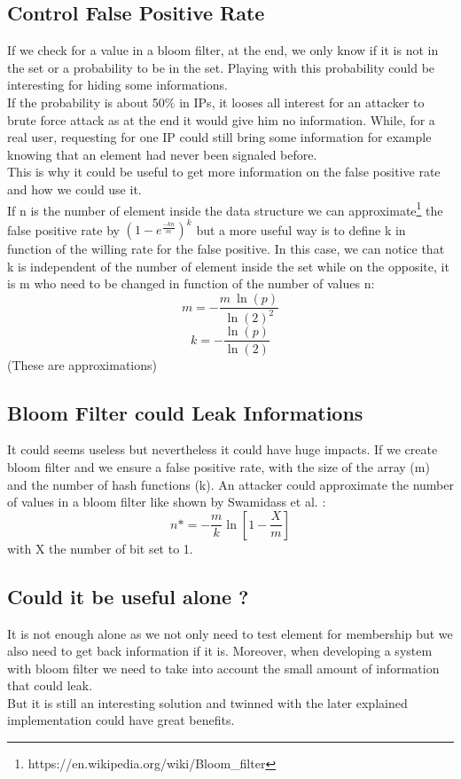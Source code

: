 \documentclass{eplmastersthesis}
\begin{document}
\subsection{Control False Positive Rate}
If we check for a value in a bloom filter, at the end, we only know if it is not in the set or a probability to be in the set. Playing with this probability could be interesting for hiding some informations. \\
If the probability is about 50\% in IPs, it looses all interest for an attacker to brute force attack as at the end it would give him no information. While, for a real user, requesting for one IP could still bring some information for example knowing that an element had never been signaled before.\\
This is why it could be useful to get more information on the false positive rate and how we could use it.\\

If n is the number of element inside the data structure we can approximate\footnote{https://en.wikipedia.org/wiki/Bloom\_filter} the false positive rate by $(1-e^{\frac{-kn}{m}})^k$ but a more useful way is to define k in function of the willing rate for the false positive. In this case, we can notice that k is independent of the number of element inside the set while on the opposite, it is m who need to be changed in function of the number of values n:
$$m = - \frac{m\ \ln(p)}{\ln(2)^2}$$
$$k = - \frac{\ln(p)}{\ln(2)}$$
(These are approximations)

\subsection{Bloom Filter could Leak Informations}
It could seems useless but nevertheless it could have huge impacts. If we create bloom filter and we ensure a false positive rate, with the size of the array (m) and the number of hash functions (k). An attacker could approximate the number of values in a bloom filter like shown by Swamidass et al. \cite{swamidass2007mathematical}:
$$n* = - \frac{m}{k} \ln\left[1 - \frac{X}{m}\right] $$
with X the number of bit set to 1.

\subsection{Could it be useful alone ?}
It is not enough alone as we not only need to test element for membership but we also need to get back information if it is. Moreover, when developing a system with bloom filter we need to take into account the small amount of information that could leak. \\
But it is still an interesting solution and twinned with the later explained implementation could have great benefits.
\end{document}
